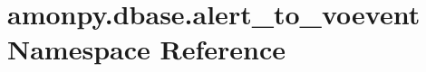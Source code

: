 \hypertarget{namespaceamonpy_1_1dbase_1_1alert__to__voevent}{\section{amonpy.\-dbase.\-alert\-\_\-to\-\_\-voevent Namespace Reference}
\label{namespaceamonpy_1_1dbase_1_1alert__to__voevent}
}
